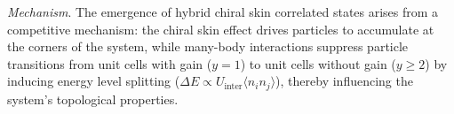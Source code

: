 \documentclass[longbibliography, aps, prx, amsmath, amssymb, amsfonts, twocolumn,superscriptaddress, footinbib]{revtex4-1}
\begin{document}



	\textit{Mechanism}. The emergence of hybrid chiral skin correlated states arises from a competitive mechanism: the chiral skin effect drives particles to accumulate at the corners of the system, while many-body interactions suppress particle transitions from unit cells with gain ($y=1$) to unit cells without gain ($y \geq 2$) by inducing energy level splitting ($\Delta E \propto U_{\text{inter}}\langle n_i n_j \rangle$), thereby influencing the system's topological properties.
	
\end{document}
